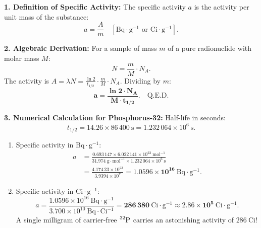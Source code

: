 \begin{solution}
\textbf{1. Definition of Specific Activity:}
The specific activity $a$ is the activity per unit mass of the substance:
\[
a = \frac{A}{m} \quad [\mathrm{Bq\cdot g^{-1}} \text{ or } \mathrm{Ci\cdot g^{-1}}].
\]

\textbf{2. Algebraic Derivation:}
For a sample of mass $m$ of a pure radionuclide with molar mass $M$:
\[
N = \frac{m}{M} \cdot N_A.
\]
The activity is $A = \lambda N = \frac{\ln 2}{t_{1/2}} \cdot \frac{m}{M} \cdot N_A$.
Dividing by $m$:
\[
\mathbf{a = \frac{\ln 2 \cdot N_A}{M \cdot t_{1/2}}}. \quad \text{Q.E.D.}
\]

\textbf{3. Numerical Calculation for Phosphorus-32:}
Half-life in seconds:
\[
t_{1/2} = 14.26 \times 86\,400\ \mathrm{s} = 1.232\,064 \times 10^6\ \mathrm{s}.
\]
\begin{enumerate}[leftmargin=1.4em,itemsep=2pt]
  \item Specific activity in $\mathrm{Bq\cdot g^{-1}}$:
  \begin{align*}
  a &= \frac{0.693\,147 \times 6.022\,141 \times 10^{23}\ \mathrm{mol^{-1}}}{31.974\ \mathrm{g\cdot mol^{-1}} \times 1.232\,064 \times 10^6\ \mathrm{s}} \\
    &= \frac{4.174\,23 \times 10^{23}}{3.9394 \times 10^7} = \mathbf{1.0596 \times 10^{16}\ \mathrm{Bq\cdot g^{-1}}}.
  \end{align*}
  \item Specific activity in $\mathrm{Ci\cdot g^{-1}}$:
  \[
  a = \frac{1.0596 \times 10^{16}\ \mathrm{Bq\cdot g^{-1}}}{3.700 \times 10^{10}\ \mathrm{Bq\cdot Ci^{-1}}} = \mathbf{286\,380\ \mathrm{Ci\cdot g^{-1}}} \approx \mathbf{2.86 \times 10^5\ \mathrm{Ci\cdot g^{-1}}}.
  \]
  A single milligram of carrier-free $\ce{^{32}P}$ carries an astonishing activity of $286\ \mathrm{Ci}$!
\end{enumerate}
\end{solution}

